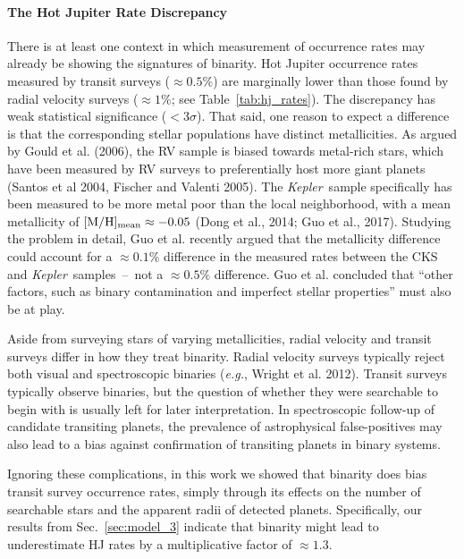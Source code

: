 \paragraph{The Hot Jupiter Rate Discrepancy}
There is at least one context in which measurement of 
occurrence rates may already be showing the signatures of binarity.
Hot Jupiter occurrence rates measured by transit surveys ($\approx 0.5\%$) are 
marginally lower than those found by radial velocity surveys ($\approx 1\%$; 
see Table~\ref{tab:hj_rates}).
The discrepancy has weak statistical significance ($<3\sigma$).
That said, one reason to expect a difference is that the corresponding stellar 
populations have distinct metallicities.
As argued by Gould et al. (2006), the RV sample is biased towards 
metal-rich stars, which have been measured by RV surveys to preferentially 
host more giant planets (Santos et al 2004, Fischer and Valenti 2005).
The {\it Kepler}\ sample specifically has been measured to be more metal poor 
than the local neighborhood, with a mean metallicity of $[{\rm M/H}]_{\rm 
    mean}\approx -0.05$ (Dong et al., 2014; Guo et al., 2017).
Studying the problem in detail, Guo et al. recently argued that the 
metallicity difference could account for a $\approx 0.1\%$ difference in the 
measured rates between the CKS and {\it Kepler}\ samples~--~not a $\approx 
0.5\%$ difference.
Guo et al. concluded that ``other factors, such as binary contamination and 
imperfect stellar properties'' must also be at play.

Aside from surveying stars of varying metallicities, radial velocity and 
transit surveys differ in how they treat binarity.
Radial velocity surveys typically reject both visual and spectroscopic binaries
({\it e.g.}, Wright et al. 2012).
Transit surveys typically observe binaries, but the question of whether they 
were searchable to begin with is usually left for later interpretation.
In spectroscopic follow-up of candidate transiting planets, the prevalence of 
astrophysical false-positives may also lead to a bias against confirmation of 
transiting planets in binary systems.

Ignoring these complications, in this work we showed that
binarity does bias transit survey occurrence rates, simply through its 
effects on the number of searchable stars and the apparent radii of detected 
planets.
Specifically, our results from Sec.~\ref{sec:model_3} indicate that binarity 
might lead to underestimate HJ rates by a multiplicative factor of $\approx 
1.3$.

